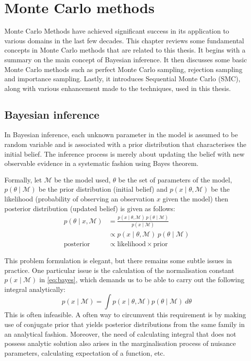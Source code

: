 \chapter{Monte Carlo methods}
\graphicspath{{Chapter2/figures/}}
\label{cha:mcmethods}
Monte Carlo Methods have achieved significant success in its application to various domains in the last few decades. This chapter reviews some fundamental concepts in Monte Carlo methods that are related to this thesis. It begins with a summary on the main concept of Bayesian inference. It then discusses some basic Monte Carlo methods such as perfect Monte Carlo sampling, rejection sampling and importance sampling. Lastly, it introduces Sequential Monte Carlo (SMC), along with various enhancement made to the techniques, used in this thesis.

\section{Bayesian inference}
In Bayesian inference, each unknown parameter in the model is assumed to be random variable and is associated with a prior distribution that characterises the initial belief. The inference process is merely about updating the belief with new observable evidence in a systematic fashion using Bayes theorem.

Formally, let $\mathcal{M}$ be the model used, $\theta$ be the set of parameters of the model, $p\left(\theta \mid \mathcal{M}\right)$ be the prior distribution (initial belief) and $p(x \mid \theta, \mathcal{M})$ be the likelihood (probability of observing an observation $x$ given the model) then posterior distribution (updated belief) is given as follows:  
\begin{align}
  p(\theta \mid x , \mathcal{M}) &= \frac{p(x \mid \theta , \mathcal{M})~p(\theta \mid \mathcal{M})}{p(x \mid \mathcal{M})} \nonumber \\
                   &\propto p(x \mid \theta , \mathcal{M})~p(\theta \mid \mathcal{M}) \label{eq:bayes} \\
  \text{posterior} &\propto \text{likelihood} \times \text{prior}
\end{align}

This problem formulation is elegant, but there remains some subtle issues in practice. One particular issue is the calculation of the normalisation constant $p(x \mid \mathcal{M})$ in \eqref{eq:bayes}, which demands us to be able to carry out the following integral  analytically:
\begin{equation}
  p(x \mid \mathcal{M}) = \int p(x \mid \theta, \mathcal{M}) p(\theta \mid \mathcal{M})~d\theta
\end{equation}
This is often infeasible. A often way to circumvent this requirement is by making use of conjugate prior that yields posterior distributions from the same family in an analytical fashion. Moreover, the need of calculating integral that does not possess analytic solution also arises in the marginalisation process of nuisance parameters, calculating expectation of a function, etc.

